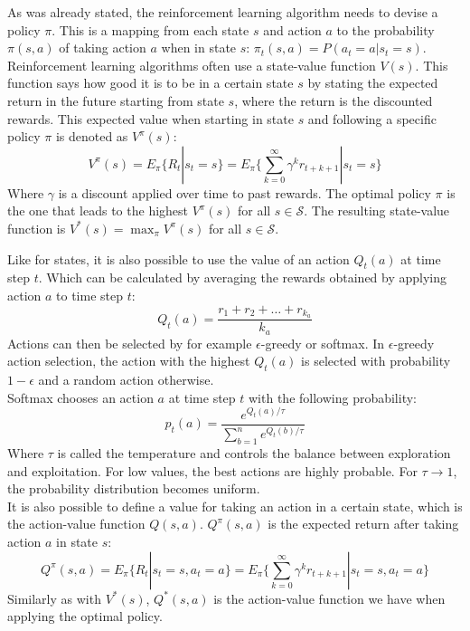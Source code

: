 \documentclass[a4paper]{article}
\begin{document}
As was already stated, the reinforcement learning algorithm needs to devise a policy $\pi$. This is a mapping from each state $s$ and action $a$ to the probability $\pi(s,a)$ of taking action $a$ when in state $s$: $\pi_t(s,a) = P(a_t = a | s_t = s)$.\\
Reinforcement learning algorithms often use a state-value function $V(s)$. This function says how good it is to be in a certain state $s$ by stating the expected return in the future starting from state $s$, where the return is the discounted rewards. This expected value when starting in state $s$ and following a specific policy $\pi$ is denoted as $V^\pi(s)$:
\begin{equation}
\label{eq:vpolicy}
V^\pi(s) = E_\pi\{R_t|s_t=s\}=E_\pi\big \{ \sum_{k=0}^{\infty}\gamma^k r_{t+k+1} | s_t=s\big \}
\end{equation}
Where $\gamma$ is a discount applied over time to past rewards. The optimal policy $\pi$ is the one that leads to the highest $V^\pi(s)$ for all $s \in \mathcal{S}$. The resulting state-value function is $V^*(s) = \max_\pi V^\pi(s)$ for all $s \in \mathcal{S}$.

Like for states, it is also possible to use the value of an action $Q_t(a)$ at time step $t$. Which can be calculated by averaging the rewards obtained by applying action $a$ to time step $t$:
\begin{equation}
Q_t(a) = \frac{r_1 + r_2 + \dots + r_{k_a}}{k_a}
\end{equation}
Actions can then be selected by for example $\epsilon$-greedy or softmax. In $\epsilon$-greedy action selection, the action with the highest $Q_t(a)$ is selected with probability $1-\epsilon$ and a random action otherwise.\\
Softmax chooses an action $a$ at time step $t$ with the following probability:
\begin{equation}
p_t(a) = \frac{e^{Q_t(a)/\tau}}{\sum_{b=1}^n e^{Q_t(b)/\tau}}
\end{equation}
Where $\tau$ is called the temperature and controls the balance between exploration and exploitation. For low values, the best actions are highly probable. For $\tau \to 1$, the probability distribution becomes uniform.\\

It is also possible to define a value for taking an action in a certain state, which is the action-value function $Q(s,a)$. $Q^\pi(s,a)$ is the expected return after taking action $a$ in state $s$:
\begin{equation}
Q^\pi(s,a) = E_\pi\{R_t|s_t=s,a_t=a\}=E_\pi\big \{ \sum_{k=0}^{\infty}\gamma^k r_{t+k+1} | s_t=s,a_t=a\big \}
\end{equation}
Similarly as with $V^*(s)$, $Q^*(s,a)$ is the action-value function we have when applying the optimal policy.
\end{document}
